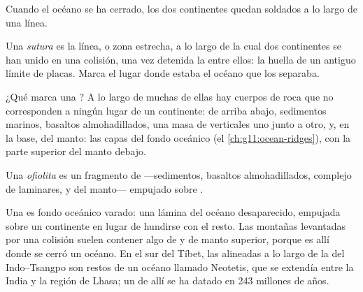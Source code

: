 Cuando el océano se ha cerrado, los dos continentes quedan soldados a lo largo de una línea.

\begin{definition}[Sutura]\label{def:g12:mountain-building:suture}
Una \emph{sutura} es la línea, o zona estrecha, a lo largo de la
cual dos continentes se han unido en una colisión, una vez detenida la
 entre ellos: la huella de un antiguo límite de placas. Marca el
lugar donde estaba el océano que los separaba.
\end{definition}

¿Qué marca una ? A lo largo de muchas de ellas hay cuerpos de roca que
no corresponden a ningún lugar de un continente: de arriba abajo, sedimentos
marinos, basaltos almohadillados, una masa de  verticales uno junto a
otro,  y, en la base,  del manto: las capas del fondo oceánico
(el \cref{ch:g11:ocean-ridges}), con la parte superior del manto debajo.

\begin{definition}[Ofiolita]\label{def:g12:mountain-building:ophiolite}
Una \emph{ofiolita} es un fragmento de 
---sedimentos, basaltos almohadillados, complejo de  laminares,  y
 del manto--- empujado sobre .
\end{definition}

Una  es fondo oceánico varado: una lámina del océano desaparecido,
empujada sobre un continente en lugar de hundirse con el resto. Las montañas
levantadas por una colisión suelen contener algo de  y de
manto superior, porque es allí donde se cerró un océano. En el sur del Tíbet,
las  alineadas a lo largo de la  del Indo--Tsangpo son restos
de un océano llamado Neotetis, que se extendía entre la India y la región de
Lhasa; un  de allí se ha datado en 243 millones de años.

